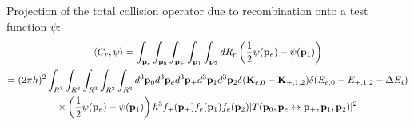 \documentclass{article}[draft]
\begin{document}
Projection of the total collision operator due to recombination onto a test function $\psi$:
\begin{multline*}
\left< C_r, \psi \right> = 
\int_{\vect{p}_e} \int_{\vect{p}_0} 
\int_{\vect{p}_+} \int_{\vect{p}_1} \int_{\vect{p}_2} 
d R_r \left( \frac12 \psi\of{\vect{p}_e} 
- \psi\of{\vect{p}_1} \right) 
\\
= (2\pi h)^2 
\int_{R^3} \int_{R^3} 
\int_{R^3} \int_{R^3} \int_{R^3} 
d^3 \vect{p}_0 d^3 \vect{p}_e
d^3 \vect{p}_+ d^3 \vect{p}_1 d^3 \vect{p}_2 
\delta\of{\vect{K}_{e,0} - \vect{K}_{+,1,2}} 
\delta\of{E_{e,0} - E_{+,1,2} - \Delta E_i}
\\
\times
\left( \frac12 \psi\of{\vect{p}_e}
- \psi\of{\vect{p}_1} \right) h^3 f_+\of{\vect{p}_+} f_e\of{\vect{p}_1}  f_e\of{\vect{p}_2} 
| T\of{\vect{p}_0, \vect{p}_e \leftrightarrow \vect{p}_+, \vect{p}_1, \vect{p}_2} |^2
\end{multline*}
\end{document}
